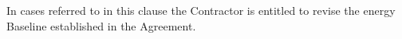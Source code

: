 \begin{multicols}{2}
In cases referred to in this clause the Contractor is entitled to revise the energy Baseline established in the Agreement.

\end{multicols}
